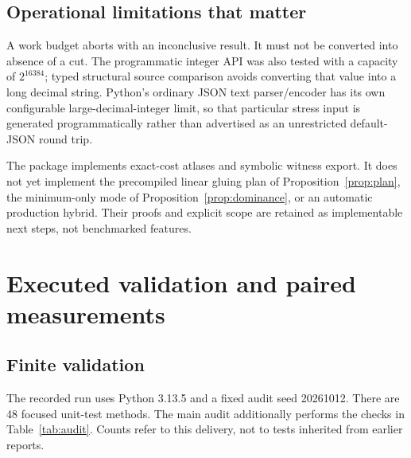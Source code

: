 \documentclass[11pt,letterpaper]{article}
\theoremstyle{definition}
\theoremstyle{remark}\newtheorem{remark}[theorem]{Remark}
\begin{document}
\subsection{Operational limitations that matter}
A work budget aborts with an inconclusive result. It must not be converted into absence of a cut. The programmatic integer API was also tested with a capacity of $2^{16384}$; typed structural source comparison avoids converting that value into a long decimal string. Python's ordinary JSON text parser/encoder has its own configurable large-decimal-integer limit, so that particular stress input is generated programmatically rather than advertised as an unrestricted default-JSON round trip.

The package implements exact-cost atlases and symbolic witness export. It does not yet implement the precompiled linear gluing plan of Proposition~\ref{prop:plan}, the minimum-only mode of Proposition~\ref{prop:dominance}, or an automatic production hybrid. Their proofs and explicit scope are retained as implementable next steps, not benchmarked features.

\section{Executed validation and paired measurements}
\label{sec:evidence}
\subsection{Finite validation}
The recorded run uses Python 3.13.5 and a fixed audit seed 20261012. There are 48 focused unit-test methods. The main audit additionally performs the checks in Table~\ref{tab:audit}. Counts refer to this delivery, not to tests inherited from earlier reports.
\end{document}
